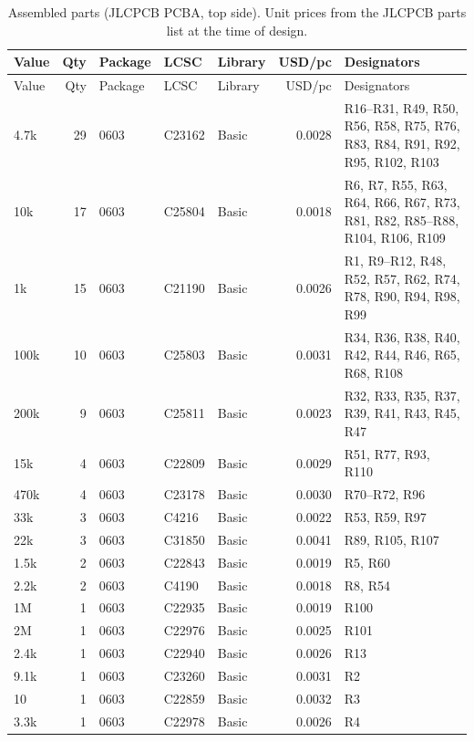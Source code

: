 \begin{longtable}{@{}l r l l l r p{5.2cm}@{}}
\caption{Assembled parts (JLCPCB PCBA, top side). Unit prices from the JLCPCB parts list at the time of design.}\label{tab:bom}\\
\toprule Value & Qty & Package & LCSC & Library & USD/pc & Designators\\ \midrule\endfirsthead
\toprule Value & Qty & Package & LCSC & Library & USD/pc & Designators\\ \midrule\endhead
\bottomrule\endfoot
4.7k & 29 & 0603 & C23162 & Basic & 0.0028 & {\footnotesize R16--R31, R49, R50, R56, R58, R75, R76, R83, R84, R91, R92, R95, R102, R103}\\
10k & 17 & 0603 & C25804 & Basic & 0.0018 & {\footnotesize R6, R7, R55, R63, R64, R66, R67, R73, R81, R82, R85--R88, R104, R106, R109}\\
1k & 15 & 0603 & C21190 & Basic & 0.0026 & {\footnotesize R1, R9--R12, R48, R52, R57, R62, R74, R78, R90, R94, R98, R99}\\
100k & 10 & 0603 & C25803 & Basic & 0.0031 & {\footnotesize R34, R36, R38, R40, R42, R44, R46, R65, R68, R108}\\
200k & 9 & 0603 & C25811 & Basic & 0.0023 & {\footnotesize R32, R33, R35, R37, R39, R41, R43, R45, R47}\\
15k & 4 & 0603 & C22809 & Basic & 0.0029 & {\footnotesize R51, R77, R93, R110}\\
470k & 4 & 0603 & C23178 & Basic & 0.0030 & {\footnotesize R70--R72, R96}\\
33k & 3 & 0603 & C4216 & Basic & 0.0022 & {\footnotesize R53, R59, R97}\\
22k & 3 & 0603 & C31850 & Basic & 0.0041 & {\footnotesize R89, R105, R107}\\
1.5k & 2 & 0603 & C22843 & Basic & 0.0019 & {\footnotesize R5, R60}\\
2.2k & 2 & 0603 & C4190 & Basic & 0.0018 & {\footnotesize R8, R54}\\
1M & 1 & 0603 & C22935 & Basic & 0.0019 & {\footnotesize R100}\\
2M & 1 & 0603 & C22976 & Basic & 0.0025 & {\footnotesize R101}\\
2.4k & 1 & 0603 & C22940 & Basic & 0.0026 & {\footnotesize R13}\\
9.1k & 1 & 0603 & C23260 & Basic & 0.0031 & {\footnotesize R2}\\
10 & 1 & 0603 & C22859 & Basic & 0.0032 & {\footnotesize R3}\\
3.3k & 1 & 0603 & C22978 & Basic & 0.0026 & {\footnotesize R4}\\

\end{longtable}
